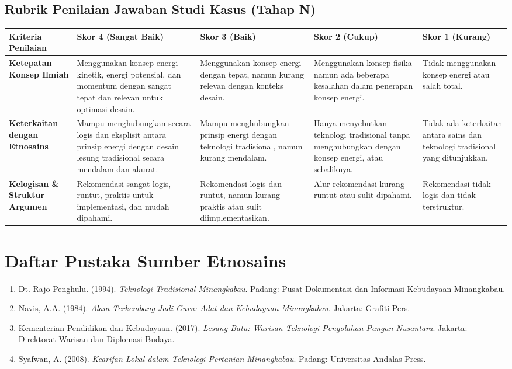\documentclass[a4paper,12pt]{article}
\begin{document}
\subsection{Rubrik Penilaian Jawaban Studi Kasus (Tahap N)}

\begin{longtable}{|p{3cm}|p{3cm}|p{3cm}|p{3cm}|p{3cm}|}
\hline
\textbf{Kriteria Penilaian} & \textbf{Skor 4 (Sangat Baik)} & \textbf{Skor 3 (Baik)} & \textbf{Skor 2 (Cukup)} & \textbf{Skor 1 (Kurang)} \\
\hline
\textbf{Ketepatan Konsep Ilmiah} & Menggunakan konsep energi kinetik, energi potensial, dan momentum dengan sangat tepat dan relevan untuk optimasi desain. & Menggunakan konsep energi dengan tepat, namun kurang relevan dengan konteks desain. & Menggunakan konsep fisika namun ada beberapa kesalahan dalam penerapan konsep energi. & Tidak menggunakan konsep energi atau salah total. \\
\hline
\textbf{Keterkaitan dengan Etnosains} & Mampu menghubungkan secara logis dan eksplisit antara prinsip energi dengan desain lesung tradisional secara mendalam dan akurat. & Mampu menghubungkan prinsip energi dengan teknologi tradisional, namun kurang mendalam. & Hanya menyebutkan teknologi tradisional tanpa menghubungkan dengan konsep energi, atau sebaliknya. & Tidak ada keterkaitan antara sains dan teknologi tradisional yang ditunjukkan. \\
\hline
\textbf{Kelogisan \& Struktur Argumen} & Rekomendasi sangat logis, runtut, praktis untuk implementasi, dan mudah dipahami. & Rekomendasi logis dan runtut, namun kurang praktis atau sulit diimplementasikan. & Alur rekomendasi kurang runtut atau sulit dipahami. & Rekomendasi tidak logis dan tidak terstruktur. \\
\hline
\end{longtable}

\section{Daftar Pustaka Sumber Etnosains}

\begin{enumerate}
\item Dt. Rajo Penghulu. (1994). \textit{Teknologi Tradisional Minangkabau}. Padang: Pusat Dokumentasi dan Informasi Kebudayaan Minangkabau.
\item Navis, A.A. (1984). \textit{Alam Terkembang Jadi Guru: Adat dan Kebudayaan Minangkabau}. Jakarta: Grafiti Pers.
\item Kementerian Pendidikan dan Kebudayaan. (2017). \textit{Lesung Batu: Warisan Teknologi Pengolahan Pangan Nusantara}. Jakarta: Direktorat Warisan dan Diplomasi Budaya.
\item Syafwan, A. (2008). \textit{Kearifan Lokal dalam Teknologi Pertanian Minangkabau}. Padang: Universitas Andalas Press.
\end{enumerate}
\end{document}
